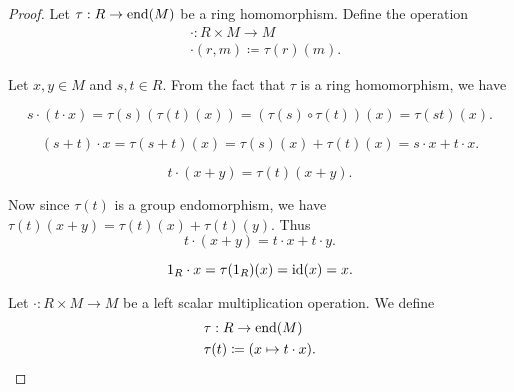 \begin{proof}
   Let \( \tau: R \to \operatorname{end}(M) \) be a ring homomorphism. Define the operation
  \begin{align*}
    &\cdot: R \times M \to M \\
    &\cdot(r, m) \coloneqq \tau(r)(m).
  \end{align*}

  Let \( x, y \in M \) and \( s, t \in R \). From the fact that \( \tau \) is a ring homomorphism, we have
  \begin{description}
    \begin{equation*}
      s \cdot (t \cdot x)
      =
      \tau(s)(\tau(t)(x))
      =
      (\tau(s) \circ \tau(t))(x)
      =
      \tau(st)(x).
    \end{equation*}

    \begin{equation*}
      (s + t) \cdot x
      =
      \tau(s + t)(x)
      =
      \tau(s)(x) + \tau(t)(x)
      =
      s \cdot x + t \cdot x.
    \end{equation*}

    \begin{equation*}
      t \cdot (x + y)
      =
      \tau(t)(x + y).
    \end{equation*}

    Now since \( \tau(t) \) is a group endomorphism, we have \( \tau(t)(x + y) = \tau(t)(x) + \tau(t)(y) \). Thus
    \begin{equation*}
      t \cdot (x + y)
      =
      t \cdot x + t \cdot y.
    \end{equation*}

    \begin{equation*}
      1_R \cdot x
      =
      \tau(1_R)(x)
      =
      \operatorname{id}(x)
      =
      x.
    \end{equation*}
  \end{description}

   Let \( \cdot: R \times M \to M \) be a left scalar multiplication operation. We define
  \begin{align*}
    &\tau: R \to \operatorname{end}(M) \\
    &\tau(t) \coloneqq (x \mapsto t \cdot x).
  \end{align*}


\end{proof}
